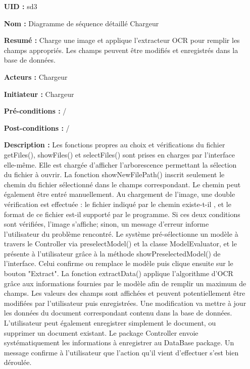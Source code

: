 \begin{itemize}
	\item[{\bf UID :}] sd3
	\item[{\bf Nom :}] Diagramme de séquence détaillé Chargeur
	\item[{\bf Resumé :}]  Charge une image et applique l'extracteur OCR pour remplir les champs appropriés. Les champs peuvent être modifiés et enregistrés dans la base de données.
	\item[{\bf Acteurs :}] Chargeur
	\item[{\bf Initiateur :}] Chargeur
	\item[{\bf Pré-conditions :}]  /
	\item[{\bf Post-conditions :}]  /
		\smallbreak
	\item[{\bf Description :}]
	Les fonctions propres au choix et vérifications du fichier getFiles(), showFiles() et selectFiles() sont prises en charges par l'interface elle-même. Elle est chargée d'afficher l'arborescence permettant la sélection du fichier à ouvrir. La fonction showNewFilePath() inscrit seulement le chemin du fichier sélectionné dans le champs correspondant. Le chemin peut également être entré manuellement.
	\medbreak
	Au chargement de l'image, une double vérification est effectuée : le fichier indiqué par le chemin existe-t-il , et le format de ce fichier est-il supporté par le programme. Si ces deux conditions sont vérifiées, l'image s'affiche; sinon, un message d'erreur informe l'utilisateur du problème rencontré.
	\medbreak
	Le système pré-sélectionne un modèle à travers le Controller via preselectModel() et la classe ModelEvaluator, et le présente à l'utilisateur grâce à la méthode showPreselectedModel() de l'interface.
	Celui confirme ou remplace le modèle puis clique ensuite sur le bouton "Extract". 
	\medbreak
	La fonction extractData() applique l'algorithme d'OCR grâce aux informations fournies par le modèle afin de remplir un maximum de champs. Les valeurs des champs sont affichées et peuvent potentiellement être modifiées par l'utilisateur puis enregistrées. Une modification va mettre à jour les données du document correspondant contenu dans la base de données. L'utilisateur peut également enregistrer simplement le document, ou supprimer un document existant. Le package Controller envoie systématiquement les informations à enregistrer au DataBase package. Un message confirme à l'utilisateur que l'action qu'il vient d'effectuer s'est bien déroulée.
\end{itemize}


